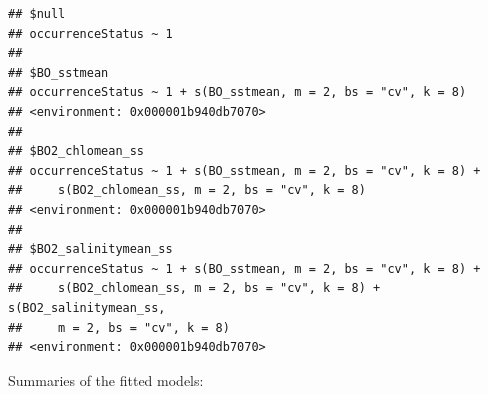 \documentclass[
]{book}
\newenvironment{Shaded}{\begin{snugshade}}{\end{snugshade}}
\newcommand{\FunctionTok}[1]{\textcolor[rgb]{0.13,0.29,0.53}{\textbf{#1}}}
\newcommand{\NormalTok}[1]{#1}
\newcommand{\SpecialCharTok}[1]{\textcolor[rgb]{0.81,0.36,0.00}{\textbf{#1}}}
\begin{document}
\begin{verbatim}
## $null
## occurrenceStatus ~ 1
## 
## $BO_sstmean
## occurrenceStatus ~ 1 + s(BO_sstmean, m = 2, bs = "cv", k = 8)
## <environment: 0x000001b940db7070>
## 
## $BO2_chlomean_ss
## occurrenceStatus ~ 1 + s(BO_sstmean, m = 2, bs = "cv", k = 8) + 
##     s(BO2_chlomean_ss, m = 2, bs = "cv", k = 8)
## <environment: 0x000001b940db7070>
## 
## $BO2_salinitymean_ss
## occurrenceStatus ~ 1 + s(BO_sstmean, m = 2, bs = "cv", k = 8) + 
##     s(BO2_chlomean_ss, m = 2, bs = "cv", k = 8) + s(BO2_salinitymean_ss, 
##     m = 2, bs = "cv", k = 8)
## <environment: 0x000001b940db7070>
\end{verbatim}

Summaries of the fitted models:

\begin{Shaded}
\end{Shaded}
\end{document}
